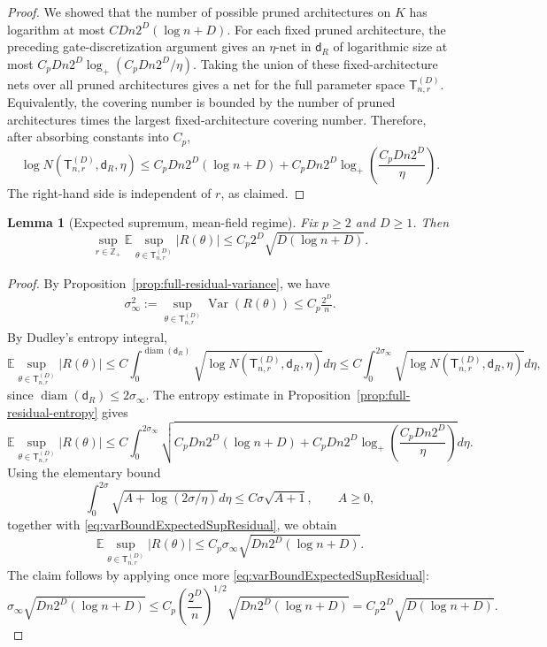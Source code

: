\documentclass[12pt]{article}
\newtheorem{lemma}[theorem]{Lemma}
\newcommand{\E}{\mathbb{E}}
\newcommand{\tvar}{\operatorname{Var}}
\begin{document}
\begin{proof}
We showed that the number of possible pruned architectures on \(K\) has logarithm at most $C Dn2^D(\log n+D)$. For each fixed pruned architecture, the preceding gate-discretization argument
gives an \(\eta\)-net in \(\mathsf{d}_{R}\) of logarithmic size at most $C_pDn2^D
    \log_+ (C_pDn2^D/\eta)$. Taking the union of these fixed-architecture nets over all pruned
architectures gives a net for the full parameter space \(\mathsf{T}_{n,r}^{(D)}\).
Equivalently, the covering number is bounded by the number of pruned
architectures times the largest fixed-architecture covering number. Therefore,
after absorbing constants into \(C_p\),
\[
\log N(\mathsf{T}_{n,r}^{(D)},\mathsf{d}_{R},\eta)
\le
C_pDn2^D(\log n+D)
+
C_pDn2^D
\log_+\left(\frac{C_pDn2^D}{\eta}\right).
\]
The right-hand side is independent of $r$, as claimed.

\end{proof}


\begin{lemma}[Expected supremum, mean-field regime]
\label{lem:expected-sup-residual}
Fix \(p\ge 2\) and \(D\ge 1\). Then
\[
\sup_{r\in\mathbb Z_+}
\E
\sup_{\theta \in \mathsf{T}_{n,r}^{(D)}}
|R(\theta)|
\le
C_p
2^{D}
\sqrt{D(\log n+D)}.
\]
\end{lemma}

\begin{proof}
By Proposition~\ref{prop:full-residual-variance}, we have
\begin{align}\label{eq:varBoundExpectedSupResidual}
\sigma_\infty^2
:=
\sup_{\theta \in \mathsf{T}_{n,r}^{(D)}}
\tvar
(
R(\theta)
) 
\le
C_p\frac{2^D}{n}.
\end{align}
By Dudley's entropy integral,
\[
\E\sup_{\theta \in \mathsf{T}_{n,r}^{(D)}} |R (\theta)|
\le
C \int_0^{\operatorname{diam}(\mathsf{d}_R)}
\sqrt{
\log N(\mathsf{T}_{n,r}^{(D)},\mathsf{d}_R,\eta)
}
d\eta
\le
C
\int_0^{2\sigma_\infty}
\sqrt{
\log N(\mathsf{T}_{n,r}^{(D)},\mathsf{d}_R,\eta)
}
d\eta ,
\]
since \(\operatorname{diam}(\mathsf{d}_R)\le 2\sigma_\infty\). The entropy estimate in Proposition~\ref{prop:full-residual-entropy} gives
\[
\E\sup_{\theta \in \mathsf{T}_{n,r}^{(D)}} |R (\theta)|
\le
C
\int_0^{2\sigma_\infty}
\sqrt{
C_pDn2^D(\log n+D)
+
C_pDn2^D
\log_+\left(\frac{C_pDn2^D}{\eta}\right)
}
d\eta.
\]
Using the elementary bound
\[
\int_0^{2\sigma}
\sqrt{
A+\log(2\sigma/\eta)
}
d\eta
\le
C\sigma\sqrt{A+1},
\qquad A\ge 0,
\]
together with \eqref{eq:varBoundExpectedSupResidual}, we obtain
\[
\E\sup_{\theta \in \mathsf{T}_{n,r}^{(D)}} |R(\theta)|
\le
C_p
\sigma_\infty
\sqrt{Dn2^D(\log n+D)}.
\]
The claim follows by applying once more \eqref{eq:varBoundExpectedSupResidual}:
\[
\sigma_\infty
\sqrt{Dn2^D(\log n+D)}
\le
C_p
\left(\frac{2^D}{n}\right)^{1/2}
\sqrt{Dn2^D(\log n+D)}
=
C_p
2^D
\sqrt{D(\log n+D)}.
\]
\end{proof}
\end{document}
